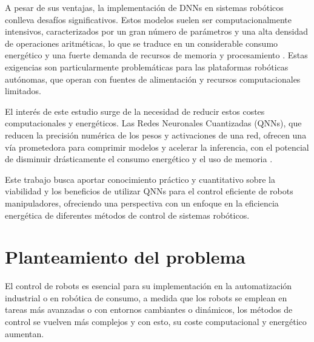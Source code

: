 \documentclass[12pt]{article}
\begin{document}
A pesar de sus ventajas, la implementación de DNNs en sistemas robóticos conlleva desafíos significativos. Estos modelos suelen ser computacionalmente intensivos, caracterizados por un gran número de parámetros y una alta densidad de operaciones aritméticas, lo que se traduce en un considerable consumo energético y una fuerte demanda de recursos de memoria y procesamiento \cite{Chen2021memristor, Liang2021PruningSurvey}. Estas exigencias son particularmente problemáticas para las plataformas robóticas autónomas, que operan con fuentes de alimentación y recursos computacionales limitados\cite{Bartolozzi2022embodied, deVriesGao2025AIenergy}.

El interés de este estudio surge de la necesidad de reducir estos costes computacionales y energéticos. Las Redes Neuronales Cuantizadas (QNNs), que reducen la precisión numérica de los pesos y activaciones de una red, ofrecen una vía prometedora para comprimir modelos y acelerar la inferencia, con el potencial de disminuir drásticamente el consumo energético y el uso de memoria \cite{Liang2021PruningSurvey, ZhangL2025FLQ}.

Este trabajo busca aportar conocimiento práctico y cuantitativo sobre la viabilidad y los beneficios de utilizar QNNs para el control eficiente de robots manipuladores, ofreciendo una perspectiva con un enfoque en la eficiencia energética de diferentes métodos de control de sistemas robóticos.


\section{Planteamiento del problema}
El control de robots es esencial para su implementación en la automatización industrial o en robótica de consumo, a medida que los robots se emplean en tareas más avanzadas o con entornos cambiantes o dinámicos, los métodos de control se vuelven más complejos y con esto, su coste computacional y energético aumentan\cite{JuarezLora2024Thesis, Park2025electronics}.
\end{document}
